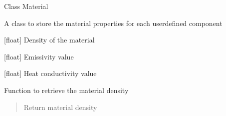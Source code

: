 \documentclass[letterpaper,10pt,english]{sphinxmanual}
\begin{document}
\begin{fulllineitems}
\label{\detokenize{modules:material.Material}}
\pysigstartsignatures
{}
\pysigstopsignatures
\sphinxAtStartPar
Class Material

\sphinxAtStartPar
A class to store the material properties for each user\sphinxhyphen{}defined component

\begin{fulllineitems}
\label{\detokenize{modules:material.Material.density}}
\pysigstartsignatures
{}
\pysigstopsignatures
\sphinxAtStartPar
{[}float{]} Density of the material

\end{fulllineitems}


\begin{fulllineitems}
\label{\detokenize{modules:material.Material.emissivity}}
\pysigstartsignatures
{}
\pysigstopsignatures
\sphinxAtStartPar
{[}float{]} Emissivity value

\end{fulllineitems}


\begin{fulllineitems}
\label{\detokenize{modules:material.Material.heatConductivity}}
\pysigstartsignatures
{}
\pysigstopsignatures
\sphinxAtStartPar
{[}float{]} Heat conductivity value

\end{fulllineitems}


\begin{fulllineitems}
\label{\detokenize{modules:material.Material.material_density}}
\pysigstartsignatures
{}
\pysigstopsignatures
\sphinxAtStartPar
Function to retrieve the material density
\begin{quote}\begin{description}
\sphinxAtStartPar
{} \textendash{} Return material density


\end{description}
\end{quote}
\end{fulllineitems}
\end{fulllineitems}
\end{document}
